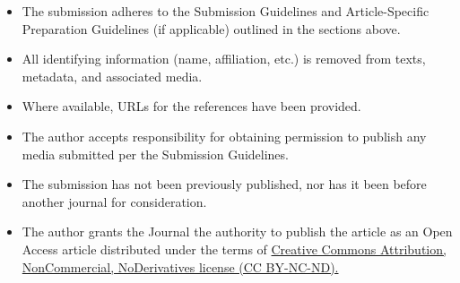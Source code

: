 \documentclass[12pt]{article}
\begin{document}
\begin{itemize}[noitemsep]
    \item The submission adheres to the Submission Guidelines and Article-Specific Preparation Guidelines (if applicable) outlined in the sections above.
    \item All identifying information (name, affiliation, etc.) is removed from texts, metadata, and associated media.
    \item Where available, URLs for the references have been provided.
    \item The author accepts responsibility for obtaining permission to publish any media submitted per the Submission Guidelines.
    \item The submission has not been previously published, nor has it been before another journal for consideration.
    \item The author grants the Journal the authority to publish the article as an Open Access article distributed under the terms of \href{https://creativecommons.org/licenses/by-nc-nd/4.0/}{Creative Commons Attribution, NonCommercial, NoDerivatives license (CC BY-NC-ND).} 
\end{itemize}

\printbibliography
\end{document}
